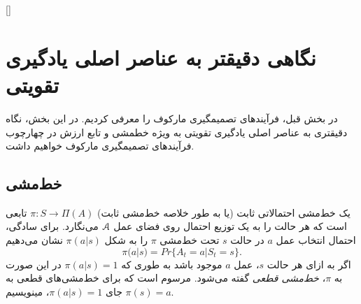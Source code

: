 \begin{table}[]
	\centering
\end{table}

[]


\section{
	نگاهی دقیق\nf تر به عناصر اصلی یادگیری تقویتی}
در بخش قبل،  فرآیندهای تصمیم\nf گیری مارکوف را معرفی کردیم. در این بخش، نگاه دقیق\nf تری به عناصر اصلی یادگیری تقویتی به ویژه خط\nf مشی و تابع ارزش در چهارچوب فرآیندهای تصمیم\nf گیری مارکوف خواهیم داشت.

\subsection{خط‌مشی}
یک خط‌مشی احتمالاتی ثابت (یا به طور خلاصه خط‌مشی ثابت) 
$\pi: S \to \Pi(A)$
تابعی است که هر حالت را به یک توزیع احتمال روی فضای عمل
$\EuScript{A}$
 می‌نگارد.
برای سادگی، احتمال انتخاب عمل $a$ در حالت $s$ تحت خط‌مشی $\pi$ را به شکل
$\pi(a|s)$
نشان می‌دهیم
$$\pi(a|s) = Pr\{A_t = a | S_t = s\}.$$
اگر به ازای هر حالت $s$، عمل $a$ موجود باشد به طوری که 
$\pi(a|s) = 1$
در این صورت به $\pi$،
\textit{خط‌مشی قطعی}
گفته می‌شود. مرسوم است که برای خط‌مشی‌های قطعی به جای 
$\pi(a|s) = 1$،
می\nf نویسیم
$\pi(s) = a$.

